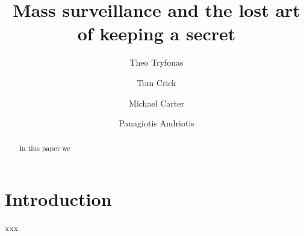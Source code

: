\documentclass{llncs}
\begin{document}
\title{Mass surveillance and the lost art of keeping a secret}

\author{Theo Tryfonas \and Tom Crick \and Michael Carter \and Panagiotis Andriotis}

\maketitle

\begin{abstract}
In this paper we 
\end{abstract}

\section{Introduction}
\label{sec:Introduction}
xxx
\end{document}

